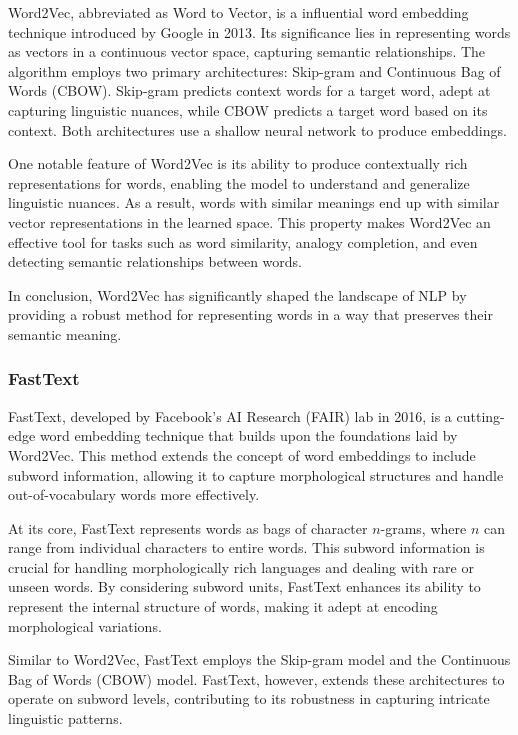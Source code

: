 Word2Vec, abbreviated as Word to Vector, is a influential word embedding technique introduced by Google in 2013. Its significance lies in representing words as vectors in a continuous vector space, capturing semantic relationships. The algorithm employs two primary architectures: Skip-gram and Continuous Bag of Words (CBOW). Skip-gram predicts context words for a target word, adept at capturing linguistic nuances, while CBOW predicts a target word based on its context. Both architectures use a shallow neural network to produce embeddings.

One notable feature of Word2Vec is its ability to produce contextually rich representations for words, enabling the model to understand and generalize linguistic nuances. As a result, words with similar meanings end up with similar vector representations in the learned space. This property makes Word2Vec an effective tool for tasks such as word similarity, analogy completion, and even detecting semantic relationships between words.

In conclusion, Word2Vec has significantly shaped the landscape of NLP by providing a robust method for representing words in a way that preserves their semantic meaning.









\subsubsection{FastText}


FastText, developed by Facebook's AI Research (FAIR) lab in 2016, is a cutting-edge word embedding technique that builds upon the foundations laid by Word2Vec. This method extends the concept of word embeddings to include subword information, allowing it to capture morphological structures and handle out-of-vocabulary words more effectively.

At its core, FastText represents words as bags of character $n$-grams, where $n$ can range from individual characters to entire words. This subword information is crucial for handling morphologically rich languages and dealing with rare or unseen words. By considering subword units, FastText enhances its ability to represent the internal structure of words, making it adept at encoding morphological variations.

Similar to Word2Vec, FastText employs the Skip-gram model and the Continuous Bag of Words (CBOW) model. FastText, however, extends these architectures to operate on subword levels, contributing to its robustness in capturing intricate linguistic patterns.

